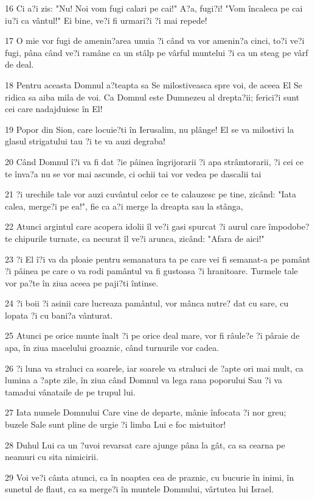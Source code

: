 \par 16 Ci a?i zis: "Nu! Noi vom fugi calari pe cai!" A?a, fugi?i! "Vom încaleca pe cai iu?i ca vântul!" Ei bine, ve?i fi urmari?i ?i mai repede!
\par 17 O mie vor fugi de amenin?area unuia ?i când va vor amenin?a cinci, to?i ve?i fugi, pâna când ve?i ramâne ca un stâlp pe vârful muntelui ?i ca un steag pe vârf de deal.
\par 18 Pentru aceasta Domnul a?teapta sa Se milostiveasca spre voi, de aceea El Se ridica sa aiba mila de voi. Ca Domnul este Dumnezeu al drepta?ii; ferici?i sunt cei care nadajduiesc în El!
\par 19 Popor din Sion, care locuie?ti în Ierusalim, nu plânge! El se va milostivi la glasul strigatului tau ?i te va auzi degraba!
\par 20 Când Domnul î?i va fi dat ?ie pâinea îngrijorarii ?i apa strâmtorarii, ?i cei ce te înva?a nu se vor mai ascunde, ci ochii tai vor vedea pe dascalii tai
\par 21 ?i urechile tale vor auzi cuvântul celor ce te calauzesc pe tine, zicând: "Iata calea, merge?i pe ea!", fie ca a?i merge la dreapta sau la stânga,
\par 22 Atunci argintul care acopera idolii îl ve?i gasi spurcat ?i aurul care împodobe?te chipurile turnate, ca necurat îl ve?i arunca, zicând: "Afara de aici!"
\par 23 ?i El î?i va da ploaie pentru semanatura ta pe care vei fi semanat-a pe pamânt ?i pâinea pe care o va rodi pamântul va fi gustoasa ?i hranitoare. Turmele tale vor pa?te în ziua aceea pe paji?ti întinse.
\par 24 ?i boii ?i asinii care lucreaza pamântul, vor mânca nutre? dat cu sare, cu lopata ?i cu bani?a vânturat.
\par 25 Atunci pe orice munte înalt ?i pe orice deal mare, vor fi râule?e ?i pâraie de apa, în ziua macelului groaznic, când turnurile vor cadea.
\par 26 ?i luna va straluci ca soarele, iar soarele va straluci de ?apte ori mai mult, ca lumina a ?apte zile, în ziua când Domnul va lega rana poporului Sau ?i va tamadui vânataile de pe trupul lui.
\par 27 Iata numele Domnului Care vine de departe, mânie înfocata ?i nor greu; buzele Sale sunt pline de urgie ?i limba Lui e foc mistuitor!
\par 28 Duhul Lui ca un ?uvoi revarsat care ajunge pâna la gât, ca sa cearna pe neamuri cu sita nimicirii.
\par 29 Voi ve?i cânta atunci, ca în noaptea cea de praznic, cu bucurie în inimi, în sunetul de flaut, ca sa merge?i în muntele Domnului, vârtutea lui Israel.
